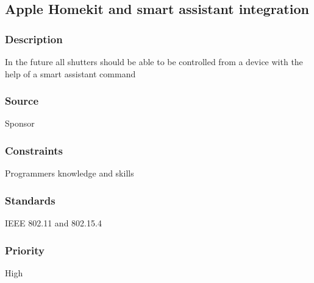 
\subsection{Apple Homekit and smart assistant integration}
\subsubsection{Description}
In the future all shutters should be able to be controlled from a device with the help of a smart assistant command
\subsubsection{Source}
Sponsor
\subsubsection{Constraints}
Programmers knowledge and skills
\subsubsection{Standards}
IEEE 802.11 and 802.15.4
\subsubsection{Priority}
High
